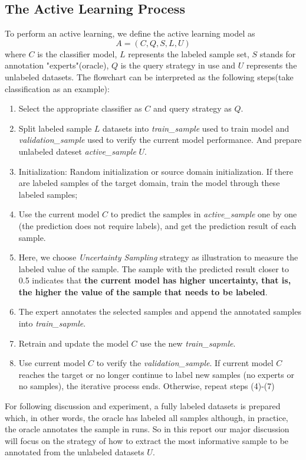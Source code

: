 \documentclass[english,12pt]{article}
\begin{document}
	\subsection{The Active Learning Process}
	To perform an active learning, we define the active learning model as \[A=(C,Q,S,L,U)\]
	where $C$ is the classifier model, $L$ represents the labeled sample set, $S$ stands for annotation "experts"(oracle), $Q$ is the query strategy in use and $U$ represents the unlabeled datasets.
	The flowchart\cite{alSurvey} can be interpreted as the following steps(take classification as an example):
	\begin{enumerate}
		\item Select the appropriate classifier as $C$ and query strategy as $Q$.
		\item Split labeled sample $L$ datasets into {\em train\_sample} used to train model and {\em validation\_sample} used to verify the current model performance. And prepare unlabeled dateset {\em active\_sample} $U$.
		\item Initialization: Random initialization or source domain initialization. If there are labeled samples of the target domain, train the model through these labeled samples;
		\item Use the current model $C$ to predict the samples in {\em active\_sample} one by one (the prediction does not require labels), and get the prediction result of each sample. 
		\item Here, we choose {\em Uncertainty Sampling} strategy as illustration to measure the labeled value of the sample. The sample with the predicted result closer to 0.5 indicates that \textbf{the current model has higher uncertainty, that is, the higher the value of the sample that needs to be labeled}.
		\item The expert annotates the selected samples and append the annotated samples into {\em train\_sapmle}.
		\item Retrain and update the model $C$ use the new {\em train\_sapmle}.
		\item Use current model $C$ to verify the {\em validation\_sample}. If current model $C$ reaches the target or no longer continue to label new samples (no experts or no samples), the iterative process ends. Otherwise, repeat steps (4)-(7)
	\end{enumerate}
	For following discussion and experiment, a fully labeled datasets is prepared which, in other words, the oracle has labeled all samples although, in practice, the oracle annotates the sample in runs. So  in this report our major discussion will focus on the strategy of how to extract the most informative sample to be annotated from the unlabeled datasets $U$. 
	
\end{document}
